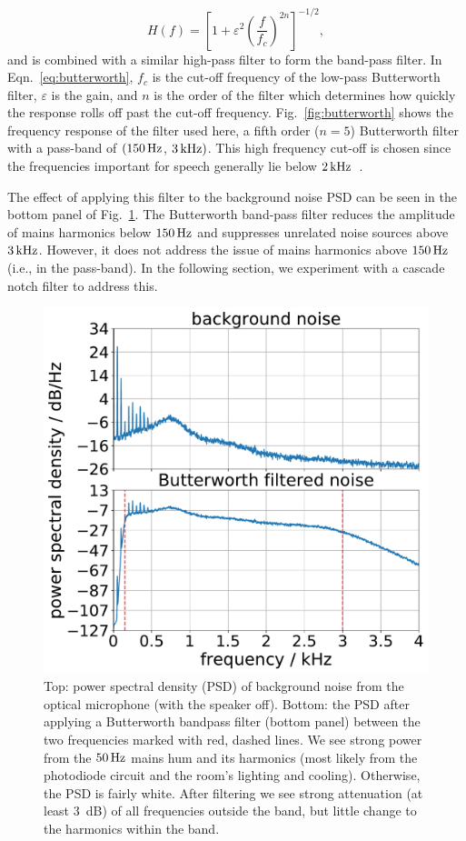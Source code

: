 \documentclass[aps,pra,superscriptaddress,reprint,nofootinbib]{revtex4-1}
\begin{document}
\begin{equation}
\label{eq:butterworth}
H(f) = \left[1+\varepsilon^2 \left( \frac{f}{f_c} \right)^{2n}\right]^{-1/2},
\end{equation}
and is combined with a similar high-pass filter to form the band-pass filter.
In Eqn.~\ref{eq:butterworth}, $f_c$ is the cut-off frequency of the low-pass Butterworth filter, $\varepsilon$ is the gain, and $n$ is the order of the filter which determines how quickly the response rolls off past the cut-off frequency. Fig.~\ref{fig:butterworth} shows the frequency response of the filter used here, a fifth order ($n = 5$) Butterworth filter with a pass-band of $(150\,{\rm Hz}$, $3\,{\rm kHz})$. This high frequency cut-off is chosen since the frequencies important for speech generally lie below $2\,{\rm kHz}$~\cite{speech_intelligibility}.

The effect of applying this filter to the background noise PSD can be seen in the bottom panel of Fig.~\ref{fig:psd_noise}. The Butterworth band-pass filter reduces the amplitude of mains harmonics below $150\,{\rm Hz}$ and suppresses unrelated noise sources above $3\,{\rm kHz}$. However, it does not address the issue of mains harmonics above $150\,{\rm Hz}$ (i.e., in the pass-band). In the following section, we experiment with a cascade notch filter to address this.

\begin{figure}
	\includegraphics[width=.45\textwidth]{figures/psd_butterworth_14_6.pdf}
	\caption{\label{fig:psd_noise}
Top: power spectral density (PSD) of background noise from the optical microphone (with the speaker off). 
Bottom: the PSD after applying a Butterworth bandpass filter (bottom panel) between the two frequencies marked with red, dashed lines. 
We see strong power from the $50\,{\rm Hz}$ mains hum and its harmonics (most likely from the photodiode circuit and the room’s lighting and cooling). Otherwise, the PSD is fairly white. 
After filtering we see strong attenuation (at least 3~dB) of all frequencies outside the band, but little change to the harmonics within the band.
}
\end{figure}
\end{document}
